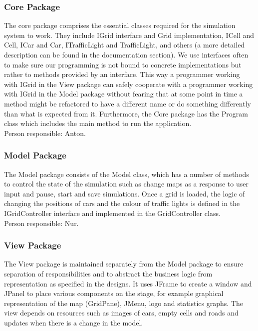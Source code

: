 \documentclass{article}
\begin{document}
	\subsubsection{Core Package}
	The core package comprises the essential classes required for the simulation system to work. They include IGrid interface and Grid implementation, ICell and Cell, ICar and Car, ITrafficLight and TrafficLight, and others (a more detailed description can be found in the documentation section). 
	We use interfaces often to make sure our programming is not bound to concrete implementations but rather to methods provided by an interface. 
	This way a programmer working with IGrid in the View package can safely cooperate with a programmer working with IGrid in the Model package without fearing that at some point in time a method might be refactored to have a different name or do something differently than what is expected from it. 
	Furthermore, the Core package has the Program class which includes the main method to run the application.\\
	
	\noindent
	Person responsible: Anton. 

\subsubsection{Model Package}
The Model package consists of the Model class, which has a number of methods to control the state of the simulation such as change maps as a response to user input and pause, start and save simulations. 
Once a grid is loaded, the logic of changing the positions of cars and the colour of traffic lights is defined in the IGridController interface and implemented in the GridController class.\\

\noindent
Person responsible: Nur. 

\subsubsection{View Package}
The View package is maintained separately from the Model package to ensure separation of responsibilities and to abstract the business logic from representation as specified in the designs. 
It uses JFrame to create a window and JPanel to place various components on the stage, for example graphical representation of the map (GridPane), JMenu, logo and statistics graphs. 
The view depends on resources such as images of cars, empty cells and roads and updates when there is a change in the model.\\
\end{document}
